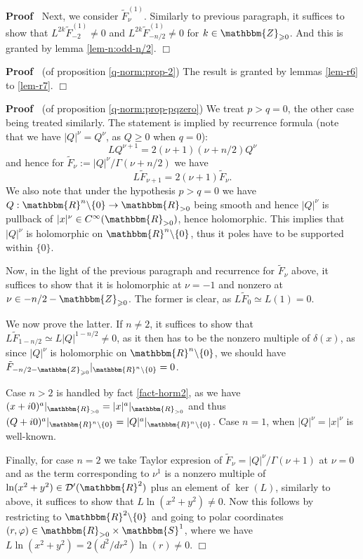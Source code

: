 \documentclass{article}
\newcommand{\assign}{:=}
\newenvironment{proof}{\noindent\textbf{Proof\ }}{\hspace*{\fill}$\Box$\medskip}
\numberwithin{definition}{section}
\numberwithin{lemma}{section}
\numberwithin{proposition}{section}
{\theorembodyfont{\rmfamily}\newtheorem{remark}{Remark}
\numberwithin{remark}{section}
}
\begin{document}
\begin{proof}
  Next, we consider $\tilde{F}_{\nu}^{( 1)}$. Similarly to previous paragraph,
  it suffices to show that $L^{2 k} \tilde{F}_{- 2}^{( 1)} \neq 0$ and $L^{2
  k} \tilde{F}_{- n / 2}^{( 1)} \neq 0$ for $k \in \mathbbm{Z}_{\geqslant 0}$.
  And this is granted by lemma \ref{lem-n:odd-n/2}.
\end{proof}

\begin{proof}
  (of proposition \ref{q-norm:prop-2}) The result is granted by lemmas
  \ref{lem-r6} to \ref{lem-r7}.
\end{proof}

\begin{proof}
  (of proposition \ref{q-norm:prop-pqzero}) We treat $p > q = 0$, the other
  case being treated similarly. The statement is implied by recurrence formula
  (note that we have $| Q |^{\nu} = Q^{\nu}$, as $Q \geqslant 0$ when $q =
  0$):
  \[ L Q^{\nu + 1} = 2 ( \nu + 1) ( \nu + n / 2) Q^{\nu} \]
  and hence for $\tilde{F}_{\nu} \assign | Q |^{\nu} / \Gamma ( \nu + n / 2)$
  we have
  \[ L \tilde{F}_{\nu + 1} = 2 ( \nu + 1) \tilde{F}_{\nu} . \]
  We also note that under the hypothesis $p > q = 0$ we have $Q :
  \mathbbm{R}^n \backslash \{ 0 \} \rightarrow \mathbbm{R}_{> 0}$ being smooth
  and hence $| Q |^{\nu}$ is pullback of $| x |^{\nu} \in C^{\infty} (
  \mathbbm{R}_{> 0})$, hence holomorphic. This implies that $| Q |^{\nu}$ is
  holomorphic on $\mathbbm{R}^n \backslash \{ 0 \}$, thus it poles have to be
  supported within $\{ 0 \}$.
  
  Now, in the light of the previous paragraph and recurrence for
  $\tilde{F}_{\nu}$ above, it suffices to show that it is holomorphic at $\nu
  = - 1$ and nonzero at $\nu \in - n / 2 -\mathbbm{Z}_{\geqslant 0}$. The
  former is clear, as $L \tilde{F}_0 \simeq L ( 1) = 0$.
  
  We now prove the latter. If $n \neq 2$, it suffices to show that $L
  \tilde{F}_{1 - n / 2} \simeq L | Q |^{1 - n / 2} \neq 0$, as it then has to
  be the nonzero multiple of $\delta ( x)$, as since $| Q |^{\nu}$ is
  holomorphic on $\mathbbm{R}^n \backslash \{ 0 \}$, we should have
  $\tilde{F}_{- n / 2 -\mathbbm{Z}_{\geqslant 0}} |_{\mathbbm{R}^n \backslash
  \{ 0 \}} = 0$.
  
  Case $n > 2$ is handled by fact \ref{fact-horm2}, as we have $( x + i 0)^a
  |_{\mathbbm{R}_{> 0}} = | x |^a |_{\mathbbm{R}_{> 0}}$ and thus $( Q + i
  0)^a |_{\mathbbm{R}^n \backslash \{ 0 \}} = | Q |^a |_{\mathbbm{R}^n
  \backslash \{ 0 \}}$. Case $n = 1$, when $| Q |^{\nu} = | x |^{\nu}$ is
  well-known.
  
  Finally, for case $n = 2$ we take Taylor expresion of $\tilde{F}_{\nu} = |
  Q |^{\nu} / \Gamma ( \nu + 1)$ at $\nu = 0$ and as the term corresponding to
  $\nu^1$ is a nonzero multiple of $\ln ( x^2 + y^2) \in \mathcal{D}' (
  \mathbbm{R}^2)$ plus an element of $\ker ( L)$, similarly to above, it
  suffices to show that $L \ln ( x^2 + y^2) \neq 0$. Now this follows by
  restricting to $\mathbbm{R}^2 \backslash \{ 0 \}$ and going to polar
  coordinates $( r, \varphi) \in \mathbbm{R}_{> 0} \times \mathbbm{S}^1$,
  where we have $L \ln ( x^2 + y^2) = 2 ( d^2 / d r^2) \ln ( r) \neq 0$.
\end{proof}
\end{document}
